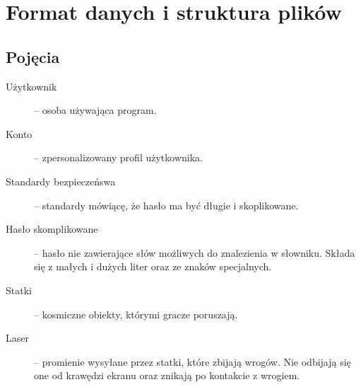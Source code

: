 \documentclass[a4paper]{article}
\begin{document}
\section{Format danych i struktura plików}

\subsection{Pojęcia}
\begin{description}
    \item[Użytkownik]-- osoba używająca program.
    \item[Konto]-- zpersonalizowany profil użytkownika.
    \item[Standardy bezpieczeńswa]-- standardy mówiącę, że hasło ma być długie i skoplikowane.
    \item[Hasło skomplikowane]-- hasło nie zawierające słów możliwych do znalezienia w słowniku. Składa się z małych i dużych liter oraz ze znaków specjalnych.
    \item[Statki]-- kosmiczne obiekty, którymi gracze poruszają.
    \item[Laser]-- promienie wysyłane przez statki, które zbijają wrogów. Nie odbijają się one od krawędzi ekranu oraz znikają po kontakcie z wrogiem.
\end{description}
\end{document}
